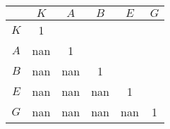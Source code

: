 \begin{tabular}{c  c  c  c  c  c}\hline \hline
     &  $K$      &     $A$   &      $B$   &      $E$  & $G$ \\ \hline
 $K$ &     1     &           &            &           &   \\ 
 $A$ & nan &      1    &            &           &   \\ 
 $B$ & nan & nan &      1     &           &   \\ 
 $E$ & nan & nan & nan &      1    &   \\ 
 $G$ & nan & nan & nan & nan & 1 \\ \hline \hline
\end{tabular}

